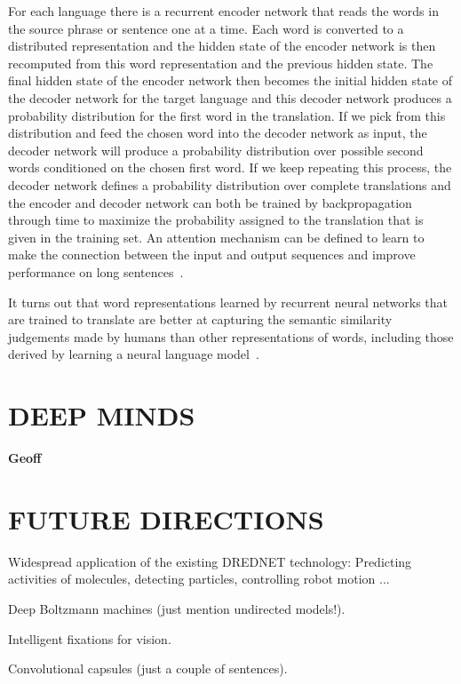 \documentclass[11pt]{article} %
\begin{document}
For each language there is a recurrent encoder network that reads the words
in the source phrase or sentence one at a time. Each word is converted to a
distributed representation and the hidden state of the encoder network is
then recomputed from this word representation and the previous hidden
state. The final hidden state of the encoder network then becomes the
initial hidden state of the decoder network for the target language and
this decoder network produces a probability distribution for the first word
in the translation. If we pick from this distribution and feed the chosen
word into the decoder network as input, the decoder network will produce a
probability distribution over possible second words conditioned on the
chosen first word. If we keep repeating this process, the decoder network
defines a probability distribution over complete translations and the
encoder and decoder network can both be trained by backpropagation through
time to maximize the probability assigned to the translation that is given
in the training set. An attention mechanism can be defined to
learn to make the connection between the input and output sequences
and improve performance on long sentences~\citep{Bahdanau-et-al-arxiv2014}.

It turns out that word representations learned by recurrent neural networks
that are trained to translate are better at capturing the semantic
similarity judgements made by humans than other representations of words,
including those derived by learning a neural language model~\citep{Hill-et-al-2014}.

\section{DEEP MINDS}


{\bf Geoff}

\section{FUTURE DIRECTIONS}


Widespread application of the existing DREDNET technology:  Predicting activities of molecules, detecting particles, controlling robot motion ...


Deep Boltzmann machines (just mention undirected models!).


Intelligent fixations for vision. 


Convolutional capsules (just a couple of sentences).\\
\end{document}
